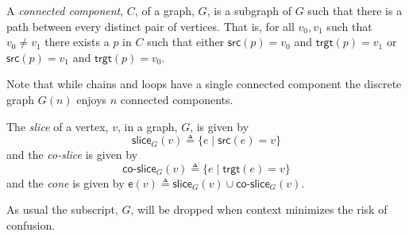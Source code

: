 \begin{definition}
  A \emph{connected component}, $C$, of a graph, $G$, is a subgraph of
  $G$ such that there is a path between every distinct pair of
  vertices. That is, for all $v_0, v_1$ such that $v_0 \neq v_1$ there
  exists a $p$ in $C$ such that either $\textsf{src}(p) = v_0$ and
  $\textsf{trgt}(p) = v_1$ or $\textsf{src}(p) = v_1$ and
  $\textsf{trgt}(p) = v_0$.
\end{definition}

\begin{remark}
  Note that while chains and loops have a single connected component
  the discrete graph $G(n)$ enjoys $n$ connected components.
\end{remark}

\begin{definition}
  The \emph{slice} of a vertex, $v$, in a graph, $G$, is given by
  \begin{equation}
    \textsf{slice}_{G}(v) \triangleq \{ e \; | \; \textsf{src}(e) = v \}
  \end{equation}
  and the \emph{co-slice} is given by
  \begin{equation}
    \textsf{co-slice}_{G}(v) \triangleq \{ e \; | \; \textsf{trgt}(e) = v \}
  \end{equation}
  and the \emph{cone} is given by $\textsf{e}(v) \triangleq \textsf{slice}_{G}(v) \cup \textsf{co-slice}_{G}(v)$.
\end{definition}

As usual the subscript, $G$, will be dropped when context minimizes
the risk of confusion.



